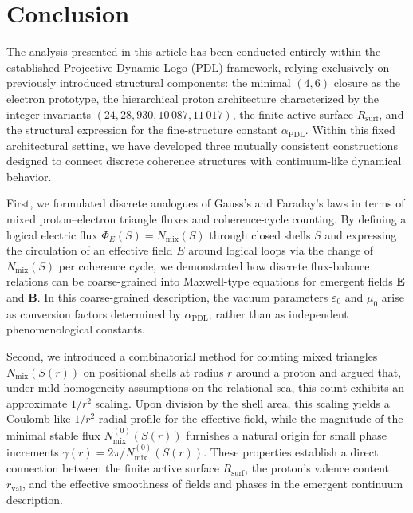 \documentclass[11pt,a4paper]{article}
\begin{document}
\section{Conclusion}

The analysis presented in this article has been conducted entirely within the established Projective Dynamic Logo (PDL) framework, relying exclusively on previously introduced structural components: the minimal $(4,6)$ closure as the electron prototype, the hierarchical proton architecture characterized by the integer invariants $(24,28,930,10\,087,11\,017)$, the finite active surface $R_{\mathrm{surf}}$, and the structural expression for the fine-structure constant $\alpha_{\mathrm{PDL}}$.\cite{Laubscher2026FullPDL,Laubscher2026CombinatorialProton,Laubscher2026Alpha,Laubscher2026SchrodingerPDL}
Within this fixed architectural setting, we have developed three mutually consistent constructions designed to connect discrete coherence structures with continuum-like dynamical behavior.

First, we formulated discrete analogues of Gauss’s and Faraday’s laws in terms of mixed proton–electron triangle fluxes and coherence-cycle counting.
By defining a logical electric flux $\Phi_{E}(S)=N_{\mathrm{mix}}(S)$ through closed shells $S$ and expressing the circulation of an effective field $E$ around logical loops via the change of $N_{\mathrm{mix}}(S)$ per coherence cycle, we demonstrated how discrete flux-balance relations can be coarse-grained into Maxwell-type equations for emergent fields $\mathbf{E}$ and $\mathbf{B}$.
In this coarse-grained description, the vacuum parameters $\varepsilon_{0}$ and $\mu_{0}$ arise as conversion factors determined by $\alpha_{\mathrm{PDL}}$, rather than as independent phenomenological constants.\cite{Laubscher2026Alpha,Laubscher2026SchrodingerSketch}

Second, we introduced a combinatorial method for counting mixed triangles $N_{\mathrm{mix}}(S(r))$ on positional shells at radius $r$ around a proton and argued that, under mild homogeneity assumptions on the relational sea, this count exhibits an approximate $1/r^{2}$ scaling.
Upon division by the shell area, this scaling yields a Coulomb-like $1/r^{2}$ radial profile for the effective field, while the magnitude of the minimal stable flux $N_{\mathrm{mix}}^{(0)}(S(r))$ furnishes a natural origin for small phase increments $\gamma(r)=2\pi/N_{\mathrm{mix}}^{(0)}(S(r))$.
These properties establish a direct connection between the finite active surface $R_{\mathrm{surf}}$, the proton’s valence content $r_{\mathrm{val}}$, and the effective smoothness of fields and phases in the emergent continuum description.\cite{Laubscher2026Alpha,Laubscher2026SchrodingerPDL}
\end{document}
